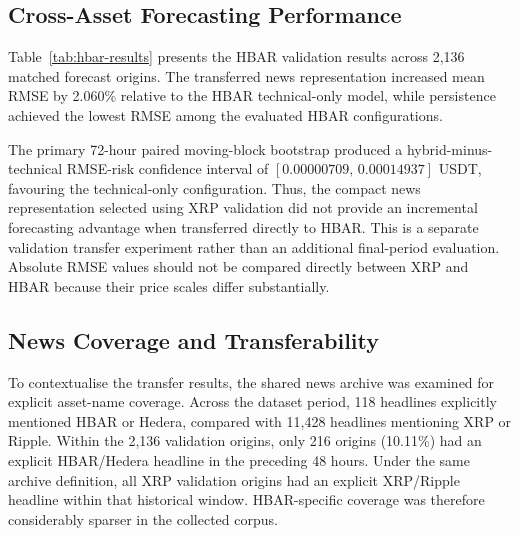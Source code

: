 \subsection{Cross-Asset Forecasting Performance}
\label{subsec:hbar-performance}

Table~\ref{tab:hbar-results} presents the HBAR validation results across 2,136 matched forecast origins. The transferred news representation increased mean RMSE by 2.060\% relative to the HBAR technical-only model, while persistence achieved the lowest RMSE among the evaluated HBAR configurations.

\begin{table}[!htbp]
\centering\small
\caption{HBAR validation results across 2,136 matched forecast origins. Neural results are five-seed means; standard deviations reflect training-seed variability. Errors are expressed in USDT per HBAR.}
\label{tab:hbar-results}
\end{table}

The primary 72-hour paired moving-block bootstrap produced a hybrid-minus-technical RMSE-risk confidence interval of $[0.00000709,\,0.00014937]$ USDT, favouring the technical-only configuration. Thus, the compact news representation selected using XRP validation did not provide an incremental forecasting advantage when transferred directly to HBAR. This is a separate validation transfer experiment rather than an additional final-period evaluation. Absolute RMSE values should not be compared directly between XRP and HBAR because their price scales differ substantially.

\subsection{News Coverage and Transferability}
\label{subsec:hbar-coverage}

To contextualise the transfer results, the shared news archive was examined for explicit asset-name coverage. Across the dataset period, 118 headlines explicitly mentioned HBAR or Hedera, compared with 11,428 headlines mentioning XRP or Ripple. Within the 2,136 validation origins, only 216 origins (10.11\%) had an explicit HBAR/Hedera headline in the preceding 48 hours. Under the same archive definition, all XRP validation origins had an explicit XRP/Ripple headline within that historical window. HBAR-specific coverage was therefore considerably sparser in the collected corpus.

